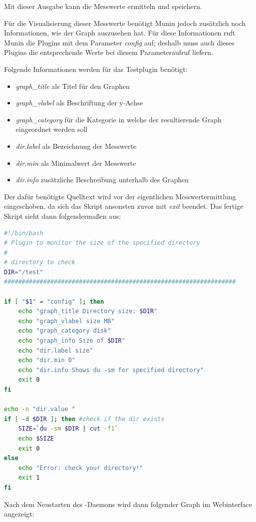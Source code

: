 Mit dieser Ausgabe kann  die Messwerte ermitteln und speichern.

Für die Visualisierung dieser Messwerte benötigt Munin jedoch zusätzlich noch Informationen, wie der Graph auszusehen hat.
Für diese Informationen ruft Munin die Plugins mit dem Parameter \textit{config} auf; deshalb muss auch dieses Plugins die entsprechende Werte bei diesem Parameteraufruf liefern.

Folgende Informationen werden für das Testplugin benötigt:

\begin{itemize}
\item \textit{graph\_title} als Titel für den Graphen
\item \textit{graph\_vlabel} als Beschriftung der y-Achse
\item \textit{graph\_category} für die Kategorie in welche der resultierende Graph eingeordnet werden soll
\item \textit{dir.label} als Bezeichnung der Messwerte
\item \textit{dir.min} als Minimalwert der Messwerte
\item \textit{dir.info} zusätzliche Beschreibung unterhalb des Graphen
\end{itemize}

Der dafür benötigte Quelltext wird vor der eigentlichen Messwertermittlung eingeschoben, da sich das Skript ansonsten zuvor mit \textit{exit} beendet.
Das fertige Skript sieht dann folgendermaßen aus:

\begin{lstlisting}[captionpos=b, caption=Fertiges Skript für den Speicherplatzbedarf eines Verzeichnises, label=du, breaklines = true, language=bash]
#!/bin/bash
# Plugin to monitor the size of the specified directory
#
# directory to check
DIR="/test"
#################################################################

if [ "$1" = "config" ]; then
	echo "graph_title Directory size: $DIR"
	echo "graph_vlabel size MB"
	echo "graph_category disk"
	echo "graph_info Size of $DIR"
	echo "dir.label size"
	echo "dir.min 0"
	echo "dir.info Shows du -sm for specified directory"
	exit 0
fi

echo -n "dir.value "
if [ -d $DIR ]; then #check if the dir exists
    SIZE=`du -sm $DIR | cut -f1`
    echo $SIZE
    exit 0
else
    echo "Error: check your directory!"
    exit 1
fi
\end{lstlisting}

Nach dem Neustarten des -Daemons wird dann folgender Graph im Webinterface angezeigt:

